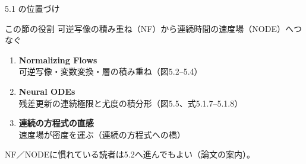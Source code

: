 \asmain
\begin{frame}{5.1 の位置づけ}
    \begin{block}{この節の役割}
        可逆写像の積み重ね（NF）から連続時間の速度場（NODE）へつなぐ
    \end{block}
    \begin{enumerate}
        \item \textbf{Normalizing Flows}\\
        可逆写像・変数変換・層の積み重ね（図5.2--5.4）
        \item \textbf{Neural ODEs}\\
        残差更新の連続極限と尤度の積分形（図5.5、式5.1.7--5.1.8）
        \item \textbf{連続の方程式の直感}\\
        速度場が密度を運ぶ（連続の方程式への橋）
    \end{enumerate}
    \vfill
    \footnotesize
    NF／NODEに慣れている読者は5.2へ進んでもよい（論文の案内）。
\end{frame}
